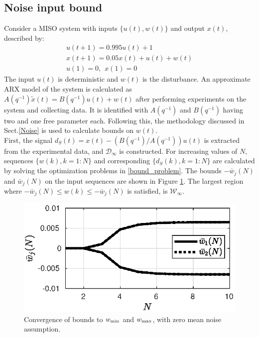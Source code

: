 \documentclass[letterpaper, 10 pt, conference]{ieeeconf}  %
\begin{document}
	\subsection{Noise input bound}
	Consider a MISO system with inputs $\{u(t),w(t)\}$ and output $x(t)$, described by:
	\begin{equation*}
	\begin{matrix}
	u(t+1) = 0.995u(t)+1 \\
	x(t+1) = 0.05x(t)+u(t)+w(t) \\
	u(1) = 0, \hspace{5pt} x(1) = 0
	\end{matrix}
	\end{equation*}
	The input $u(t)$ is deterministic and $w(t)$ is the disturbance. An approximate ARX model of the system is calculated as $A(q^{-1})\tilde{x}(t) = B(q^{-1})u(t)+w(t)$ after performing experiments on the system and collecting data. It is identified with $A(q^{-1})$ and $B(q^{-1})$ having two and one free parameter each. Following this, the methodology discussed in Sect.\ref{Noise} is used to calculate bounds on $w(t)$.
	\\
	First, the signal $d_S(t)=x(t) - (B(q^{-1})/A(q^{-1}))u(t)$ is extracted from the experimental data, and $\mathcal{D}_{\infty}$ is constructed. For increasing values of $N$, sequences $\{w(k),k=1:N\}$ and corresponding $\{d_S(k),k=1:N\}$ are calculated by solving the optimization problems in \eqref{bound_problem}. The bounds $-\bar{w}_j(N)$ and $\bar{w}_j(N)$ on the input sequences are shown in Figure \ref{bounds}.
	The largest region where $-\bar{w}_j(N) \leq w(k) \leq -\bar{w}_j(N)$ is satisfied, is $\mathcal{W}_{\infty}$. 
		\begin{figure}[h!]
			\hspace{30pt}
			\includegraphics[scale = 0.60]{bounds.eps}
			\caption{Convergence of bounds to $w_{\rm min}$ and $w_{\rm max}$, with zero mean noise assumption.}
			\label{bounds}
		\end{figure} \vspace{-5pt}\\
\end{document}
